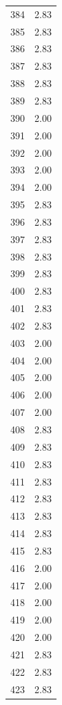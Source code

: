 \documentclass[a4paper,11pt]{article}
\begin{document}
\begin{center}
\begin{longtable}{|R{1.5cm}|R{2.5cm}|}
  384  &         2.83 \\ 
  385  &         2.83 \\ 
  386  &         2.83 \\ 
  387  &         2.83 \\ 
  388  &         2.83 \\ 
  389  &         2.83 \\ 
  390  &         2.00 \\ 
  391  &         2.00 \\ 
  392  &         2.00 \\ 
  393  &         2.00 \\ 
  394  &         2.00 \\ 
  395  &         2.83 \\ 
  396  &         2.83 \\ 
  397  &         2.83 \\ 
  398  &         2.83 \\ 
  399  &         2.83 \\ 
  400  &         2.83 \\ 
  401  &         2.83 \\ 
  402  &         2.83 \\ 
  403  &         2.00 \\ 
  404  &         2.00 \\ 
  405  &         2.00 \\ 
  406  &         2.00 \\ 
  407  &         2.00 \\ 
  408  &         2.83 \\ 
  409  &         2.83 \\ 
  410  &         2.83 \\ 
  411  &         2.83 \\ 
  412  &         2.83 \\ 
  413  &         2.83 \\ 
  414  &         2.83 \\ 
  415  &         2.83 \\ 
  416  &         2.00 \\ 
  417  &         2.00 \\ 
  418  &         2.00 \\ 
  419  &         2.00 \\ 
  420  &         2.00 \\ 
  421  &         2.83 \\ 
  422  &         2.83 \\ 
  423  &         2.83 \\ 

\end{longtable}
\end{center}
\end{document}
